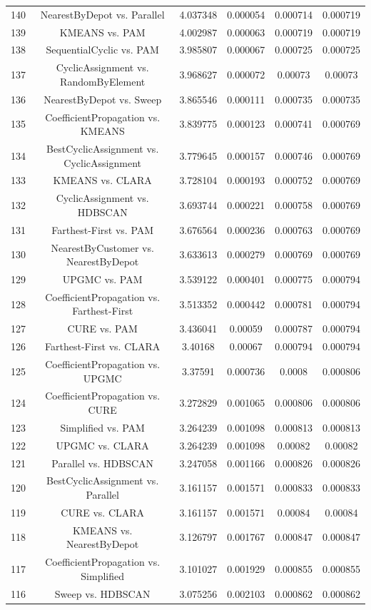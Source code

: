 \documentclass[a4paper,10pt]{article}
\begin{document}
\begin{landscape}
\begin{table}[!htp]
\begin{tabular}{cccccc}
140&NearestByDepot vs. Parallel&4.037348&0.000054&0.000714&0.000719\\
139&KMEANS vs. PAM&4.002987&0.000063&0.000719&0.000719\\
138&SequentialCyclic vs. PAM&3.985807&0.000067&0.000725&0.000725\\
137&CyclicAssignment vs. RandomByElement&3.968627&0.000072&0.00073&0.00073\\
136&NearestByDepot vs. Sweep&3.865546&0.000111&0.000735&0.000735\\
135&CoefficientPropagation vs. KMEANS&3.839775&0.000123&0.000741&0.000769\\
134&BestCyclicAssignment vs. CyclicAssignment&3.779645&0.000157&0.000746&0.000769\\
133&KMEANS vs. CLARA&3.728104&0.000193&0.000752&0.000769\\
132&CyclicAssignment vs. HDBSCAN&3.693744&0.000221&0.000758&0.000769\\
131&Farthest-First vs. PAM&3.676564&0.000236&0.000763&0.000769\\
130&NearestByCustomer vs. NearestByDepot&3.633613&0.000279&0.000769&0.000769\\
129&UPGMC vs. PAM&3.539122&0.000401&0.000775&0.000794\\
128&CoefficientPropagation vs. Farthest-First&3.513352&0.000442&0.000781&0.000794\\
127&CURE vs. PAM&3.436041&0.00059&0.000787&0.000794\\
126&Farthest-First vs. CLARA&3.40168&0.00067&0.000794&0.000794\\
125&CoefficientPropagation vs. UPGMC&3.37591&0.000736&0.0008&0.000806\\
124&CoefficientPropagation vs. CURE&3.272829&0.001065&0.000806&0.000806\\
123&Simplified vs. PAM&3.264239&0.001098&0.000813&0.000813\\
122&UPGMC vs. CLARA&3.264239&0.001098&0.00082&0.00082\\
121&Parallel vs. HDBSCAN&3.247058&0.001166&0.000826&0.000826\\
120&BestCyclicAssignment vs. Parallel&3.161157&0.001571&0.000833&0.000833\\
119&CURE vs. CLARA&3.161157&0.001571&0.00084&0.00084\\
118&KMEANS vs. NearestByDepot&3.126797&0.001767&0.000847&0.000847\\
117&CoefficientPropagation vs. Simplified&3.101027&0.001929&0.000855&0.000855\\
116&Sweep vs. HDBSCAN&3.075256&0.002103&0.000862&0.000862\\

\end{tabular}
\end{table}
\end{landscape}
\end{document}
